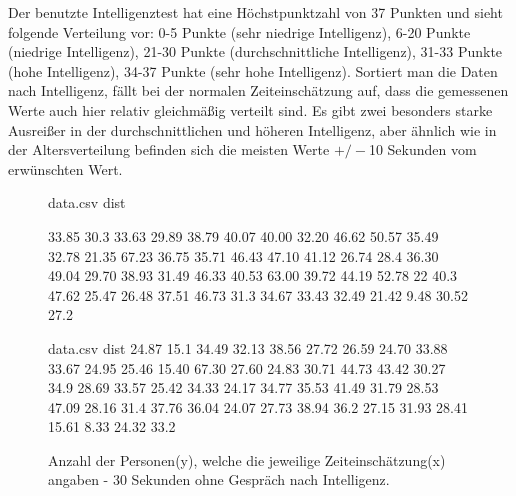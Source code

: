 \documentclass{Paper}
\begin{document}
Der benutzte Intelligenztest hat eine Höchstpunktzahl von 37 Punkten und sieht folgende Verteilung vor: 0-5 Punkte (sehr niedrige Intelligenz), 6-20 Punkte (niedrige Intelligenz), 21-30 Punkte (durchschnittliche Intelligenz), 31-33 Punkte (hohe Intelligenz), 34-37 Punkte (sehr hohe Intelligenz).
Sortiert man die Daten nach Intelligenz, fällt bei der normalen Zeiteinschätzung auf, dass die gemessenen Werte auch hier relativ gleichmäßig verteilt sind. Es gibt zwei besonders starke Ausreißer in der durchschnittlichen und höheren Intelligenz, aber ähnlich wie in der Altersverteilung befinden sich die meisten Werte $+/-$10 Sekunden vom erwünschten Wert.

\begin{figure}[H]
\begin{filecontents}{data.csv}
dist

 33.85 
 30.3 
 33.63 
 29.89 
 38.79 
 40.07 
 40.00 
 32.20 
 46.62 
 50.57 
 35.49 
 32.78 
 21.35 
 67.23 
 36.75 
 35.71
 46.43 
 47.10 
 41.12 
 26.74 
 28.4 
 36.30 
 49.04 
 29.70 
 38.93 
 31.49 
 46.33 
 40.53 
63.00 
 39.72 
 44.19 
 52.78 
 22 
 40.3 
 47.62 
 25.47 
 26.48 
 37.51 
 46.73 
 31.3 
 34.67 
 33.43 
 32.49 
 21.42 
 9.48 
 30.52 
 27.2 
\end{filecontents}
\begin{minipage}[t]{0.49\linewidth}
\caption{Anzahl der Personen(y), welche die jeweilige Zeiteinschätzung(x) angaben - 40 Sekunden ohne Gespräch nach Intelligenz.}
\label{HistZeit40sekInt}
\end{minipage}
\hfill
\begin{filecontents}{data.csv}
dist
  24.87 
 15.1 
 34.49 
 32.13 
 38.56 
 27.72 
 26.59 
 24.70 
 33.88
 33.67 
 24.95 
 25.46 
 15.40 
 67.30 
 27.60 
 24.83 
 30.71 
 44.73 
 43.42 
 30.27 
 34.9 
 28.69 
 33.57 
 25.42 
 34.33 
 24.17 
 34.77 
 35.53 
 41.49 
 31.79 
 28.53 
 47.09 
 28.16 
 31.4 
 37.76 
 36.04 
 24.07 
 27.73 
 38.94 
 36.2 
 27.15 
 31.93 
 28.41 
 15.61 
 8.33 
 24.32 
33.2 
\end{filecontents}
\begin{minipage}[t]{0.49\linewidth}
\caption{Anzahl der Personen(y), welche die jeweilige Zeiteinschätzung(x) angaben - 30 Sekunden ohne Gespräch nach Intelligenz.}
\label{HistZeit30sekInt}
\end{minipage}
\end{figure}
\end{document}

